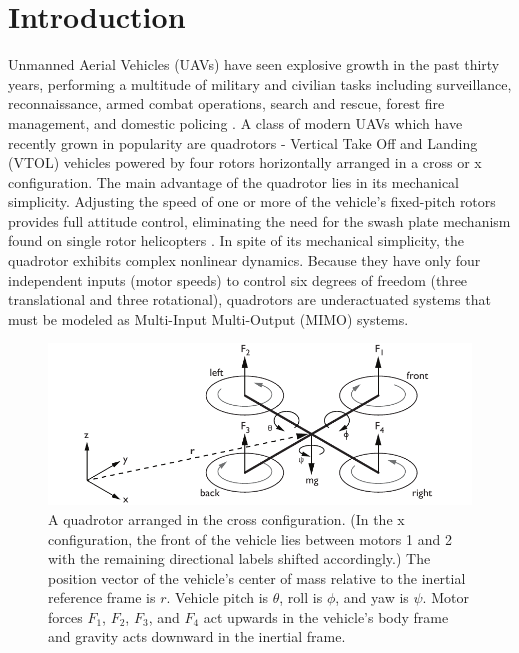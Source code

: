 \chapter{Introduction}

Unmanned Aerial Vehicles (UAVs) have seen explosive growth in the past thirty years, performing a multitude of military and civilian tasks including surveillance, reconnaissance, armed combat operations, search and rescue, forest fire management, and domestic policing \cite{sarris2001survey, valavanis2007advances}. A class of modern UAVs which have recently grown in popularity are quadrotors -  Vertical Take Off and Landing (VTOL) vehicles powered by four rotors horizontally arranged in a cross or x configuration. The main advantage of the quadrotor lies in its mechanical simplicity. Adjusting the speed of one or more of the vehicle's fixed-pitch rotors provides full attitude control, eliminating the need for the swash plate mechanism found on single rotor helicopters \cite{bramwell2001bramwell, gupte2012survey}. In spite of its mechanical simplicity, the quadrotor exhibits complex nonlinear dynamics. Because they have only four independent inputs (motor speeds) to control six degrees of freedom (three translational and three rotational), quadrotors are underactuated systems that must be modeled as Multi-Input Multi-Output (MIMO) systems.
\begin{figure}[htb!]
	\centering
	\includegraphics{../fig/quad.pdf}
	\caption[A quadrotor arranged in the cross configuration.]{A quadrotor arranged in the cross configuration. (In the x configuration, the front of the vehicle lies between motors 1 and 2 with the remaining directional labels shifted accordingly.) The position vector of the vehicle's center of mass relative to the inertial reference frame is $r$. Vehicle pitch is $\theta$, roll is $\phi$, and yaw is $\psi$. Motor forces $F_1$, $F_2$, $F_3$, and $F_4$ act upwards in the vehicle's body frame and gravity acts downward in the inertial frame.}
\end{figure}


